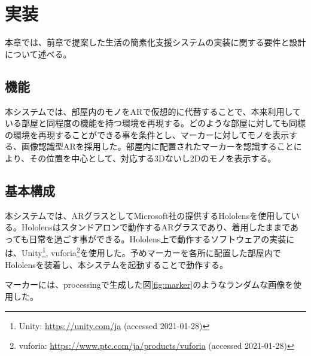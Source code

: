
\chapter{実装}
\label{chap:implementation}

本章では、前章で提案した生活の簡素化支援システムの実装に関する要件と設計について述べる。

\newpage

\section{機能}
本システムでは、部屋内のモノをARで仮想的に代替することで、本来利用している部屋と同程度の機能を持つ環境を再現する。どのような部屋に対しても同様の環境を再現することができる事を条件とし、マーカーに対してモノを表示する、画像認識型ARを採用した。部屋内に配置されたマーカーを認識することにより、その位置を中心として、対応する3Dないし2Dのモノを表示する。

\section{基本構成}

本システムでは、ARグラスとしてMicrosoft社の提供するHololensを使用している。Hololensはスタンドアロンで動作するARグラスであり、着用したままであっても日常を過ごす事ができる。Hololens上で動作するソフトウェアの実装には、Unity\footnote{Unity: \url{https://unity.com/ja} (accessed 2021-01-28)}, vuforia\footnote{vuforia: \url{https://www.ptc.com/ja/products/vuforia} (accessed 2021-01-28)}を使用した。予めマーカーを各所に配置した部屋内でHololensを装着し、本システムを起動することで動作する。

マーカーには、processingで生成した図\ref{fig:marker}のようなランダムな画像を使用した。

